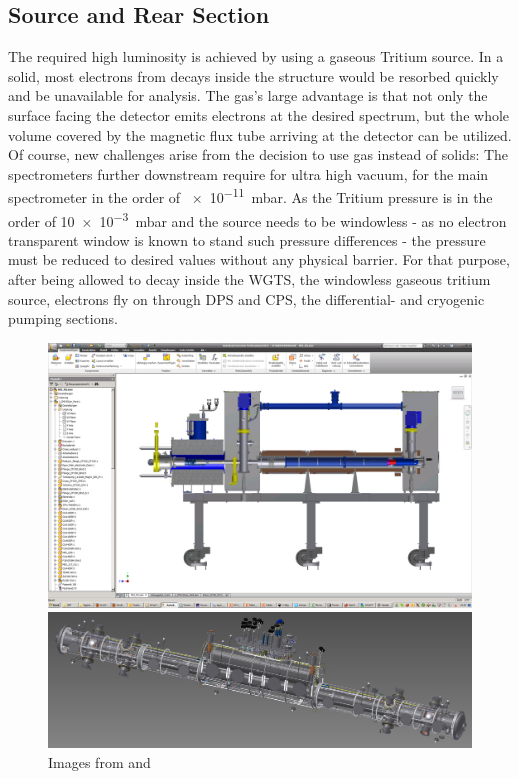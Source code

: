       \subsection{Source and Rear Section}
      \label{ch:The KATRIN experiment:sec:Experimental setup:subsec:sourceSide}
      The required high luminosity is achieved by using a gaseous Tritium source. In a solid, most electrons from decays inside the structure would be resorbed quickly and be unavailable for analysis. The gas's large advantage is that not only the surface facing the detector emits electrons at the desired spectrum, but the whole volume covered by the magnetic flux tube arriving at the detector can be utilized. Of course, new challenges arise from the decision to use gas instead of solids: The spectrometers further downstream require for ultra high vacuum, for the main spectrometer in the order of \SI{e-11}{\milli\bar}. As the Tritium pressure is in the order of \SI{10e-3}{\milli\bar} and the source needs to be windowless - as no electron transparent window is known to stand such pressure differences - the pressure must be reduced to desired values without any physical barrier. 
      For that purpose, after being allowed to decay inside the WGTS, the windowless gaseous tritium source, electrons fly on through DPS and CPS, the differential- and cryogenic pumping sections. 
      
     \begin{figure}
		\begin{minipage}{0.7\textwidth}
				\includegraphics[width = 1.0\textwidth]{graphics/katrinExperiment/rearSection.png}
		\end{minipage}
		\begin{minipage}{0.7\textwidth}
			\includegraphics[width = 1.0\textwidth]{graphics/katrinExperiment/WGTS.jpg}
		\end{minipage}
		\caption[DPS and CPS]{Images from \cite{rearSection} and \cite{WGTSDrexlin}}
		\label{fig:sourceSide}
      \end{figure}
      

